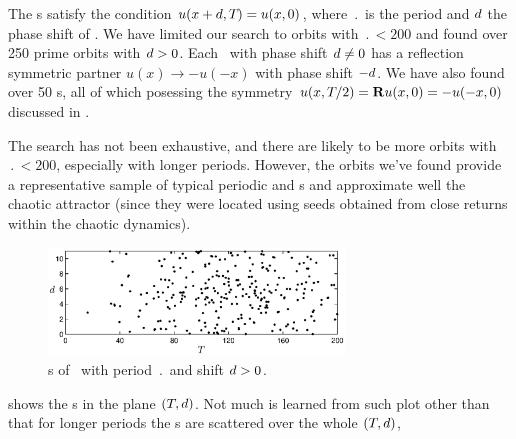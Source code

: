 

The \rpo s satisfy the condition $u(x+d,{T_{}}) = u(x,0)$, 
where $\period{}$ is the period and $d$ the phase shift of \rpo .
We have limited our search to orbits with $\period{} < 200$ and found 
over 250 prime orbits with $d > 0$.  Each \rpo\ with phase shift 
$d \neq 0$ has a reflection symmetric partner 
$u(x) \to -u(-x)$ with phase shift $-d$.  We have also found over
50 \po s, all of which posessing the symmetry $u(x,{T_{}}/2) = 
{\bf R} u(x,0) = -u(-x,0)$ discussed in .

The search has not been exhaustive, and there are likely to be more
orbits with $\period{} < 200$, especially with longer periods.  
However, the orbits we've found provide a representative sample of 
typical periodic and \rpo s and approximate well the chaotic 
attractor (since they were located using seeds obtained from close 
returns within the chaotic dynamics).

\begin{figure}[t]
\begin{center}
\includegraphics[width=0.7\textwidth]{figs/ks22_rpos_Tdelta.eps}
\end{center}
\caption{\Rpo s of \KSe\ with period $\period{}$ and shift 
$d > 0$. } \label{f:ks22rposT}
\end{figure}

 shows the \rpo s in the plane 
$({T_{}},d)$.  Not much is learned from such plot other than 
that for longer periods the \rpo s are scattered over the 
whole $({T_{}},d)$, 

